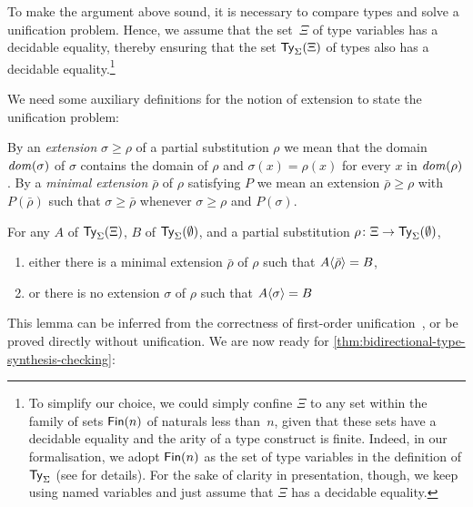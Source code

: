 \begin{remark}
To make the argument above sound, it is necessary to compare types and solve a unification problem.
Hence, we assume that the set~$\Xi$ of type variables has a decidable equality, thereby ensuring that the set $\mathsf{Ty}_{\Sigma}(\Xi)$ of types also has a decidable equality.\footnote{%
To simplify our choice, we could simply confine $\Xi$ to any set within the family of sets $\mathsf{Fin}(n)$ of naturals less than~$n$, given that these sets have a decidable equality and the arity of a type construct is finite.
Indeed, in our formalisation, we adopt $\mathsf{Fin}(n)$ as the set of type variables in the definition of $\mathsf{Ty}_{\Sigma}$ (see  for details).
For the sake of clarity in presentation, though, we keep using named variables and just assume that $\Xi$ has a decidable equality.}
\end{remark}
We need some auxiliary definitions for the notion of extension to state the unification problem:
\begin{definition}
By an \emph{extension}\/ $\sigma \geq \rho$ of a partial substitution $\rho$ we mean that the domain $\mathit{dom}(\sigma)$ of $\sigma$ contains the domain of $\rho$ and $\sigma(x) = \rho(x)$ for every\/ $x$ in $\mathit{dom}(\rho)$.
  By a \emph{minimal extension}\/ $\bar{\rho}$ of $\rho$ satisfying $P$ we mean an extension $\bar{\rho} \geq \rho$ with $P(\bar{\rho})$ such that $\sigma \geq \bar{\rho}$ whenever $\sigma \geq \rho$ and $P(\sigma)$.
\end{definition}
\begin{lemma}\label{lem:unify}
  For any\/ $A$ of\/ $\mathsf{Ty}_{\Sigma}(\Xi)$, $B$ of\/ $\mathsf{Ty}_{\Sigma}(\emptyset)$, and a partial substitution\/ $\rho \colon \Xi \to \mathsf{Ty}_{\Sigma}(\emptyset)$, 
  \begin{enumerate}
    \item either there is a minimal extension\/ $\bar{\rho}$ of\/ $\rho$ such that\/ ${A}\!\left<{\bar{\rho}}\right> = B$,
    \item or there is no extension\/ $\sigma$ of\/ $\rho$ such that\/ ${A}\!\left<{\sigma}\right> = B$
  \end{enumerate}
\end{lemma}
This lemma can be inferred from the correctness of first-order unification~\citep{McBride2003,McBride2003a}, or be proved directly without unification.
We are now ready for \cref{thm:bidirectional-type-synthesis-checking}:

